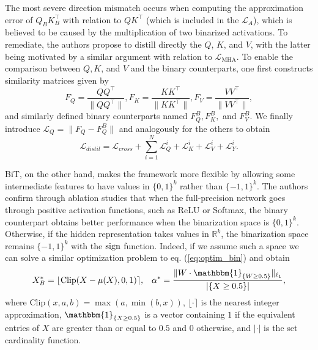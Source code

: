 The most severe direction mismatch occurs when computing the approximation error of $Q_BK_B^\top$ with relation to $Q K^\top$ (which is included in the $\mathcal{L}_A$), which is believed to be caused by the multiplication of two binarized activations. To remediate, the authors propose to distill directly the $Q$, $K$, and $V$, with the latter being motivated by a similar argument with relation to $\mathcal{L}_\text{MHA}$. To enable the comparison between $Q, K$, and $V$ and the binary counterparts, one first constructs similarity matrices given by 
\begin{equation}
    F_Q = \frac{QQ^\top}{\|QQ^\top\|},
    F_K = \frac{KK^\top}{\|KK^\top\|},
    F_V = \frac{VV^\top}{\|VV^\top\|},
\end{equation}
and similarly defined binary counterparts named $F_Q^B, F_K^B,$ and $F_V^B$. We finally introduce $\mathcal{L}_Q = \|F_Q - F_Q^B\|$ and analogously for the others to obtain
\begin{equation}
    \mathcal{L}_{distil} = \mathcal{L}_{cross} + \sum_{i=1}^N \mathcal{L}_Q^i + \mathcal{L}_K^i + \mathcal{L}_V^i + \mathcal{L}^i_Y.
\end{equation}

\vspace{1em}

BiT, on the other hand, makes the framework more flexible by allowing some intermediate features to have values in $\{0, 1\}^k$ rather than $\{-1, 1\}^k$. The authors confirm through ablation studies that when the full-precision network goes through positive activation functions, such as ReLU or Softmax, the binary counterpart obtains better performance when the binarization space is $\{0, 1\}^k$. Otherwise, if the hidden representation takes values in $\mathbb{R}^k$, the binarization space remains $\{-1, 1\}^k$ with the $\text{sign}$ function. Indeed, if we assume such a space we can solve a similar optimization problem to eq. (\ref{eq:optim_bin}) and obtain
\begin{equation}
    X_B^* = \lfloor \text{Clip}(X - \mu(X), 0, 1) \rceil, \;\;\; \alpha^* = \frac{\| W \cdot \mathbbm{1}_{\{W \geq 0.5\}} \|_{\ell_1}}{|\{X \geq 0.5\}|},
\end{equation}
where $\text{Clip}(x, a, b) = \max(a, \min(b, x))$, $\lfloor \cdot \rceil$ is the nearest integer approximation, $\mathbbm{1}_{\{X \geq 0.5\}}$ is a vector containing $1$ if the equivalent entries of $X$ are greater than or equal to $0.5$ and $0$ otherwise, and $|\cdot|$ is the set cardinality function.

